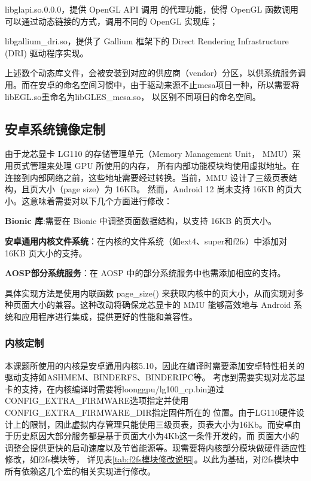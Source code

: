libglapi.so.0.0.0，提供 OpenGL API 调用 的代理功能，使得 OpenGL 函数调用可以通过动态链接的方式，调用不同的 OpenGL 实现库；

libgallium\_dri.so，提供了 Gallium 框架下的 Direct Rendering Infrastructure (DRI) 驱动程序实现。

上述数个动态库文件，会被安装到对应的供应商（vendor）分区，以供系统服务调用。而在安卓的命名空间习惯中，由于驱动来源不止mesa项目一种，所以需要将libEGL.so重命名为libGLES\_mesa.so，
以区别不同项目的命名空间。

\subsection{安卓系统镜像定制}
由于龙芯显卡 LG110 的存储管理单元（Memory Management Unit， MMU）采用页式管理来处理 GPU 所使用的内存，
所有内部功能模块均使用虚拟地址。在连接到内部网络之前，这些地址需要经过转换。当前，MMU 设计了三级页表结构，且页大小（page size）为 16KB。
然而，Android 12 尚未支持 16KB 的页大小。这意味着需要对以下几个方面进行修改：

\textbf{Bionic 库}:需要在 Bionic 中调整页面数据结构，以支持 16KB 的页大小。

\textbf{安卓通用内核文件系统}：在内核的文件系统（如ext4、super和f2fs）中添加对 16KB 页大小的支持。

\textbf{AOSP部分系统服务}：在 AOSP 中的部分系统服务中也需添加相应的支持。

具体实现方法是使用内联函数 page\_size() 来获取内核中的页大小，从而实现对多种页面大小的兼容。这种改动将确保龙芯显卡的 MMU 
能够高效地与 Android 系统和应用程序进行集成，提供更好的性能和兼容性。


\subsubsection{内核定制}
本课题所使用的内核是安卓通用内核5.10，因此在编译时需要添加安卓特性相关的驱动支持如ASHMEM、BINDERFS、BINDERIPC等。
考虑到需要实现对龙芯显卡的支持，在内核编译时需要将loonggpu/lg100\_cp.bin通过CONFIG\_EXTRA\_FIRMWARE选项指定并使用CONFIG\_EXTRA\_FIRMWARE\_DIR指定固件所在的
位置。由于LG110硬件设计上的限制，因此虚拟内存管理只能使用三级页表，页表大小为16Kb。而安卓由于历史原因大部分服务都是基于页面大小为4Kb这一条件开发的，而
页面大小的调整会提供更快的启动速度以及节省能源等\cite{lpc2023_16k}。现需要将内核部分模块做硬件适应性修改，如f2fs模块等，
详见表\ref{tab:f2fs模块修改说明}。以此为基础，对f2fs模块中所有依赖这几个宏的相关实现进行修改。

